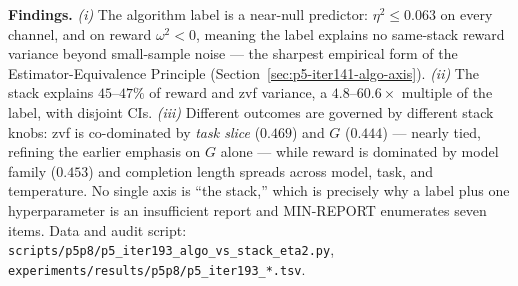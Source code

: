 \textbf{Findings.} \textit{(i)} The algorithm label is a near-null predictor:
$\eta^2 \le 0.063$ on every channel, and on reward $\omega^2 < 0$, meaning the
label explains no same-stack reward variance beyond small-sample noise --- the
sharpest empirical form of the Estimator-Equivalence Principle
(Section~\ref{sec:p5-iter141-algo-axis}). \textit{(ii)} The stack explains
$45$--$47\%$ of reward and zvf variance, a $4.8$--$60.6\times$ multiple of the
label, with disjoint CIs. \textit{(iii)} Different outcomes are governed by
different stack knobs: zvf is co-dominated by \emph{task slice}
($0.469$) and $G$ ($0.444$) --- nearly tied, refining the earlier emphasis on
$G$ alone --- while reward is dominated by model family ($0.453$) and
completion length spreads across model, task, and temperature. No single axis is
``the stack,'' which is precisely why a label plus one hyperparameter is an
insufficient report and MIN-REPORT enumerates seven items. Data and audit
script: \texttt{scripts/p5p8/p5\_iter193\_algo\_vs\_stack\_eta2.py},
\texttt{experiments/results/p5p8/p5\_iter193\_*.tsv}.
